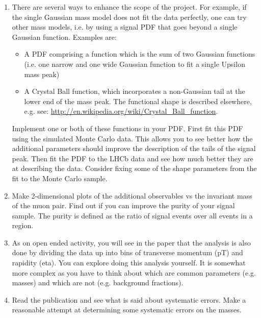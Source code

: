 \begin{enumerate}
\item There are several ways to enhance the scope of the project. For example, if the single Gaussian mass model does not fit the data perfectly, one can try other mass models, i.e. by using a signal PDF that goes beyond a single Gaussian function.  Examples are:
\begin{itemize}
\item A PDF comprising a function which is the sum of two Gaussian functions (i.e. one narrow and one wide Gaussian function to fit a single Upsilon mass peak)
\item A Crystal Ball function, which incorporates a non-Gaussian tail at the lower end of the mass peak. The functional shape is described elsewhere, e.g. see: \url{http://en.wikipedia.org/wiki/Crystal_Ball_function}. 
\end{itemize}
Implement one or both of these functions in your PDF. 
First fit this PDF using the simulated Monte Carlo data. This allows you to see better
how the additional parameters should improve the description of the tails of the signal peak.
Then fit the PDF to the LHCb data and see how much better they are at describing the data.
Consider fixing some of the shape parameters from the fit to the Monte Carlo sample.

\item Make 2-dimensional plots of the additional observables vs the invariant mass of the muon pair.
Find out if you can improve the purity of your signal sample.
The purity is defined as the ratio of signal events over all events in a region.

\item As on open ended activity, you will see in the paper that the analysis is also done by dividing the data up into bins of transverse momentum (pT) and rapidity (eta). You can explore doing this analysis yourself. It is somewhat more complex as you have to think about which are common parameters (e.g. masses) and which are not (e.g. background fractions).

\item Read the publication and see what is said about systematic errors.  Make a reasonable attempt at determining some systematic errors on the masses.


\end{enumerate}

 
 
 

